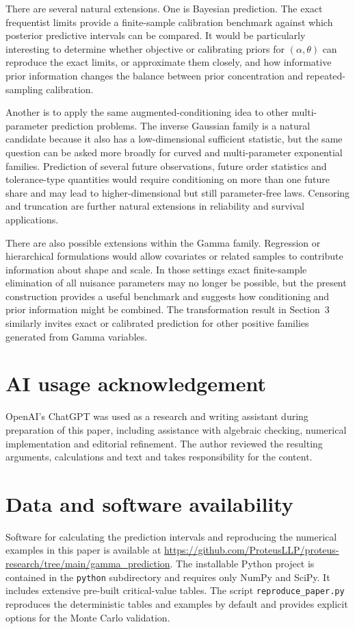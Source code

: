 \documentclass[11pt]{article}
\theoremstyle{remark}
\begin{document}
There are several natural extensions. One is Bayesian prediction. The exact frequentist limits provide a finite-sample calibration benchmark against which posterior predictive intervals can be compared. It would be particularly interesting to determine whether objective or calibrating priors for $(\alpha,\theta)$ can reproduce the exact limits, or approximate them closely, and how informative prior information changes the balance between prior concentration and repeated-sampling calibration.

Another is to apply the same augmented-conditioning idea to other multi-parameter prediction problems. The inverse Gaussian family is a natural candidate because it also has a low-dimensional sufficient statistic, but the same question can be asked more broadly for curved and multi-parameter exponential families. Prediction of several future observations, future order statistics and tolerance-type quantities would require conditioning on more than one future share and may lead to higher-dimensional but still parameter-free laws. Censoring and truncation are further natural extensions in reliability and survival applications.

There are also possible extensions within the Gamma family. Regression or hierarchical formulations would allow covariates or related samples to contribute information about shape and scale. In those settings exact finite-sample elimination of all nuisance parameters may no longer be possible, but the present construction provides a useful benchmark and suggests how conditioning and prior information might be combined. The transformation result in Section~3 similarly invites exact or calibrated prediction for other positive families generated from Gamma variables.

\section*{AI usage acknowledgement}
OpenAI's ChatGPT was used as a research and writing assistant during preparation of this paper, including assistance with algebraic checking, numerical implementation and editorial refinement. The author reviewed the resulting arguments, calculations and text and takes responsibility for the content.

\section*{Data and software availability}
Software for calculating the prediction intervals and reproducing the numerical examples in this paper is available at \url{https://github.com/ProteusLLP/proteus-research/tree/main/gamma_prediction}. The installable Python project is contained in the \texttt{python} subdirectory and requires only NumPy and SciPy. It includes extensive pre-built critical-value tables. The script \texttt{reproduce\_paper.py} reproduces the deterministic tables and examples by default and provides explicit options for the Monte Carlo validation.
\end{document}
